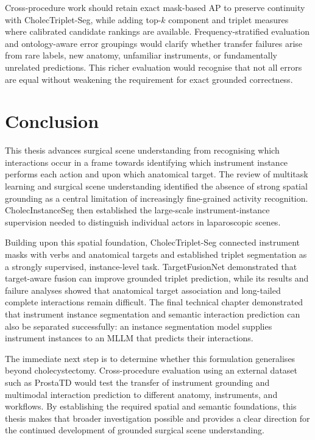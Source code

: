 Cross-procedure work should retain exact mask-based AP to preserve continuity with CholecTriplet-Seg, while adding top-$k$ component and triplet measures where calibrated candidate rankings are available. Frequency-stratified evaluation and ontology-aware error groupings would clarify whether transfer failures arise from rare labels, new anatomy, unfamiliar instruments, or fundamentally unrelated predictions. This richer evaluation would recognise that not all errors are equal without weakening the requirement for exact grounded correctness.

\section{Conclusion}
\label{sec:discussion-conclusion}

This thesis advances surgical scene understanding from recognising which interactions occur in a frame towards identifying which instrument instance performs each action and upon which anatomical target. The review of multitask learning and surgical scene understanding identified the absence of strong spatial grounding as a central limitation of increasingly fine-grained activity recognition. CholecInstanceSeg then established the large-scale instrument-instance supervision needed to distinguish individual actors in laparoscopic scenes.

Building upon this spatial foundation, CholecTriplet-Seg connected instrument masks with verbs and anatomical targets and established triplet segmentation as a strongly supervised, instance-level task. TargetFusionNet demonstrated that target-aware fusion can improve grounded triplet prediction, while its results and failure analyses showed that anatomical target association and long-tailed complete interactions remain difficult. The final technical chapter demonstrated that instrument instance segmentation and semantic interaction prediction can also be separated successfully: an instance segmentation model supplies instrument instances to an MLLM that predicts their interactions.

The immediate next step is to determine whether this formulation generalises beyond cholecystectomy. Cross-procedure evaluation using an external dataset such as ProstaTD would test the transfer of instrument grounding and multimodal interaction prediction to different anatomy, instruments, and workflows. By establishing the required spatial and semantic foundations, this thesis makes that broader investigation possible and provides a clear direction for the continued development of grounded surgical scene understanding.

